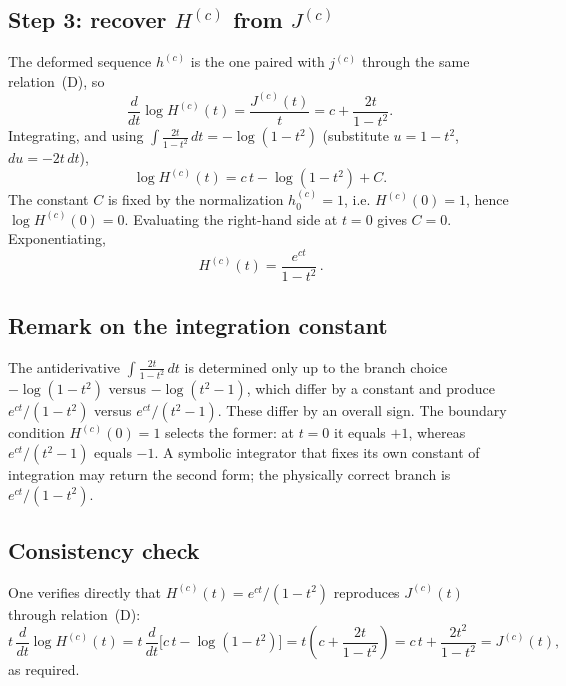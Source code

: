 \documentclass[11pt]{article}
\begin{document}
\subsection*{Step 3: recover $H^{(c)}$ from $J^{(c)}$}

The deformed sequence $h^{(c)}$ is the one paired with $j^{(c)}$ through the
same relation~(D), so
\[
  \frac{d}{dt}\log H^{(c)}(t) = \frac{J^{(c)}(t)}{t} = c + \frac{2t}{1-t^2}.
\]
Integrating, and using $\displaystyle\int \frac{2t}{1-t^2}\,dt = -\log(1-t^2)$
(substitute $u = 1-t^2$, $du = -2t\,dt$),
\[
  \log H^{(c)}(t) = c\,t - \log(1-t^2) + C.
\]
The constant $C$ is fixed by the normalization $h^{(c)}_0 = 1$, i.e.
$H^{(c)}(0) = 1$, hence $\log H^{(c)}(0) = 0$.  Evaluating the right-hand side
at $t = 0$ gives $C = 0$.  Exponentiating,
\[
  \boxed{\,H^{(c)}(t) = \frac{e^{ct}}{1-t^2}\,.}
\]

\subsection*{Remark on the integration constant}

The antiderivative $\int \frac{2t}{1-t^2}\,dt$ is determined only up to the
branch choice $-\log(1-t^2)$ versus $-\log(t^2-1)$, which differ by a
constant and produce $e^{ct}/(1-t^2)$ versus $e^{ct}/(t^2-1)$.  These differ
by an overall sign.  The boundary condition $H^{(c)}(0) = 1$ selects the
former: at $t = 0$ it equals $+1$, whereas $e^{ct}/(t^2-1)$ equals $-1$.  A
symbolic integrator that fixes its own constant of integration may return the
second form; the physically correct branch is $e^{ct}/(1-t^2)$.

\subsection*{Consistency check}

One verifies directly that $H^{(c)}(t) = e^{ct}/(1-t^2)$ reproduces
$J^{(c)}(t)$ through relation~(D):
\[
  t\,\frac{d}{dt}\log H^{(c)}(t)
    = t\,\frac{d}{dt}\bigl[c\,t - \log(1-t^2)\bigr]
    = t\left(c + \frac{2t}{1-t^2}\right)
    = c\,t + \frac{2t^2}{1-t^2}
    = J^{(c)}(t),
\]
as required.
\end{document}
